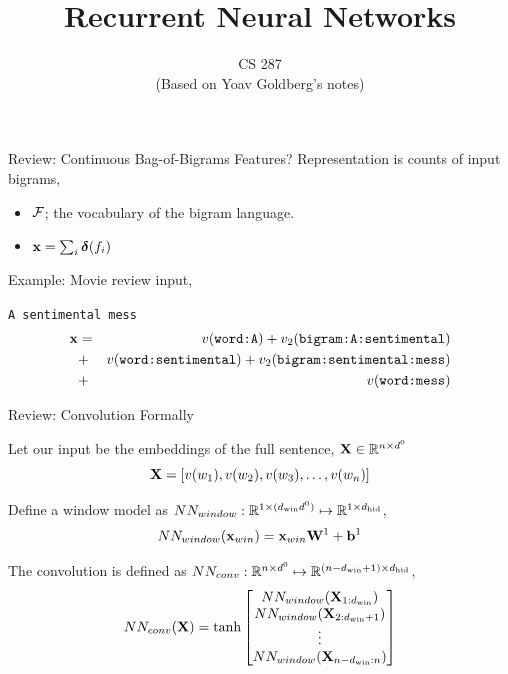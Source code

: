 \documentclass{beamer}
\title{Recurrent Neural Networks}
\date{}
\author{CS 287 \\ (Based on Yoav Goldberg's notes)}
\begin{document}
\begin{frame}
  \titlepage
\end{frame}


\begin{frame}{Review: Continuous Bag-of-Bigrams Features?}
  Representation is counts of input bigrams, 
  \begin{itemize}
  \item $\mathcal{F}$; the vocabulary of the bigram language.
  \item $\mathbf{x} = \sum_{i} \boldsymbol{\delta}(f_i)$ 
  \end{itemize}

  Example: Movie review input, 
  \begin{center}
    \texttt{A sentimental mess}
    \begin{eqnarray*}
      \mathbf{x} &=& v(\texttt{word:A})+ v_2(\texttt{bigram:A:sentimental}) \\
      &+&  v(\texttt{word:sentimental}) +   v_2(\texttt{bigram:sentimental:mess})  \\
      &+& v(\texttt{word:mess})
    \end{eqnarray*}

  \end{center}
\end{frame}

\begin{frame}{Review: Convolution Formally}
  

  Let our input be the embeddings of the full sentence, $\mathbf{X} \in \mathbb{R}^{n \times d^0}$ 
  \[\mathbf{X} = [v(w_1), v(w_2), v(w_3), \ldots, v(w_n)]\]

  Define a window model as $NN_{window}: \mathbb{R}^{1\times ({d_{\mathrm{win}}} d^0) } \mapsto \mathbb{R}^{1\times {d_{\mathrm{hid}}}}$,
  \[NN_{window}(\mathbf{x}_{win}) = \mathbf{x}_{win} \mathbf{W}^1 + \mathbf{b}^1   \]

  The convolution is defined as $NN_{conv}: \mathbb{R}^{n\times d^0} \mapsto \mathbb{R}^{(n - {d_{\mathrm{win}}} + 1) \times {d_{\mathrm{hid}}}}$, 
  \[NN_{conv}(\mathbf{X}) = \tanh \begin{bmatrix}NN_{window}(\mathbf{X}_{1:{d_{\mathrm{win}}}}) \\   
    NN_{window}(\mathbf{X}_{2:{d_{\mathrm{win}}}+1}) \\
    \vdots \\ 
    NN_{window}(\mathbf{X}_{n-{d_{\mathrm{win}}}:n}) \\
  \end{bmatrix}  \]

\end{frame}
\end{document}
